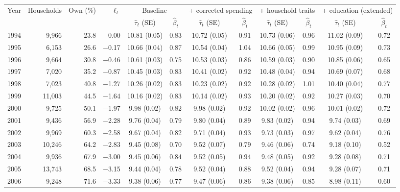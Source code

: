 \scriptsize
\begin{tabular}{rrrrcccccccc}
\toprule
Year & Households & Own (\%) & $\ell_t$ & \multicolumn{2}{c}{Baseline} & \multicolumn{2}{c}{+ corrected spending} & \multicolumn{2}{c}{+ household traits} & \multicolumn{2}{c}{+ education (extended)} \\
\cmidrule(lr){5-6}\cmidrule(lr){7-8}\cmidrule(lr){9-10}\cmidrule(lr){11-12}
 & & & & $\hat\tau_t$ (SE) & $\hat\beta_t$ & $\hat\tau_t$ (SE) & $\hat\beta_t$ & $\hat\tau_t$ (SE) & $\hat\beta_t$ & $\hat\tau_t$ (SE) & $\hat\beta_t$ \\
\midrule
1994 & 9,966 & 23.8 & 0.00 & 10.81 (0.05) & 0.83 & 10.72 (0.05) & 0.91 & 10.73 (0.06) & 0.96 & 11.02 (0.09) & 0.72 \\
1995 & 6,153 & 26.6 & $-$0.17 & 10.66 (0.04) & 0.87 & 10.54 (0.04) & 1.04 & 10.66 (0.05) & 0.99 & 10.95 (0.09) & 0.73 \\
1996 & 9,664 & 30.8 & $-$0.46 & 10.61 (0.03) & 0.75 & 10.53 (0.03) & 0.86 & 10.59 (0.03) & 0.90 & 10.85 (0.06) & 0.65 \\
1997 & 7,020 & 35.2 & $-$0.87 & 10.45 (0.03) & 0.83 & 10.41 (0.02) & 0.92 & 10.48 (0.04) & 0.94 & 10.69 (0.07) & 0.68 \\
1998 & 7,023 & 40.8 & $-$1.27 & 10.26 (0.02) & 0.83 & 10.23 (0.02) & 0.92 & 10.28 (0.02) & 1.01 & 10.40 (0.04) & 0.77 \\
1999 & 11,003 & 44.5 & $-$1.64 & 10.16 (0.02) & 0.83 & 10.14 (0.02) & 0.93 & 10.20 (0.02) & 0.92 & 10.27 (0.03) & 0.70 \\
2000 & 9,725 & 50.1 & $-$1.97 & 9.98 (0.02) & 0.82 & 9.98 (0.02) & 0.92 & 10.02 (0.02) & 0.96 & 10.01 (0.02) & 0.72 \\
2001 & 9,436 & 56.9 & $-$2.28 & 9.76 (0.04) & 0.79 & 9.80 (0.04) & 0.89 & 9.83 (0.02) & 0.94 & 9.74 (0.03) & 0.69 \\
2002 & 9,969 & 60.3 & $-$2.58 & 9.67 (0.04) & 0.82 & 9.71 (0.04) & 0.93 & 9.73 (0.03) & 0.97 & 9.62 (0.04) & 0.76 \\
2003 & 10,246 & 64.2 & $-$2.83 & 9.45 (0.08) & 0.70 & 9.52 (0.07) & 0.79 & 9.46 (0.06) & 0.74 & 9.18 (0.10) & 0.52 \\
2004 & 9,936 & 67.9 & $-$3.00 & 9.45 (0.06) & 0.84 & 9.52 (0.05) & 0.94 & 9.48 (0.05) & 0.92 & 9.28 (0.08) & 0.71 \\
2005 & 13,743 & 68.5 & $-$3.15 & 9.44 (0.04) & 0.78 & 9.52 (0.04) & 0.88 & 9.52 (0.04) & 0.94 & 9.28 (0.07) & 0.71 \\
2006 & 9,248 & 71.6 & $-$3.33 & 9.38 (0.06) & 0.77 & 9.47 (0.06) & 0.86 & 9.38 (0.06) & 0.85 & 8.98 (0.11) & 0.60 \\

\end{tabular}
